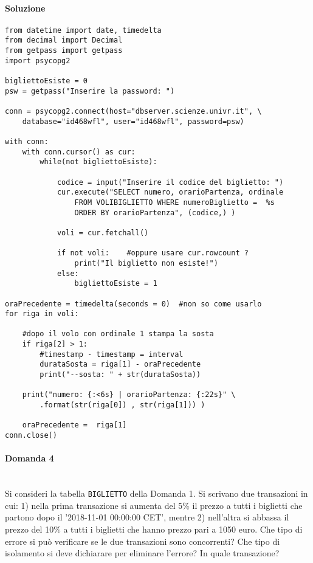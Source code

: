 \documentclass[a4paper, 10pt, titlepage]{article}
\begin{document}
\paragraph{Soluzione}\dotfill
\lstset{language=Python}
\begin{lstlisting}
from datetime import date, timedelta
from decimal import Decimal
from getpass import getpass
import psycopg2

bigliettoEsiste = 0
psw = getpass("Inserire la password: ")
    
conn = psycopg2.connect(host="dbserver.scienze.univr.it", \
	database="id468wfl", user="id468wfl", password=psw)
	
with conn:
	with conn.cursor() as cur:
		while(not bigliettoEsiste):
	
			codice = input("Inserire il codice del biglietto: ")	
			cur.execute("SELECT numero, orarioPartenza, ordinale
				FROM VOLIBIGLIETTO WHERE numeroBiglietto =  %s
				ORDER BY orarioPartenza", (codice,) )
				
			voli = cur.fetchall()
			
			if not voli:	#oppure usare cur.rowcount ?
				print("Il biglietto non esiste!")
			else:
				bigliettoEsiste = 1

oraPrecedente = timedelta(seconds = 0)	#non so come usarlo
for riga in voli:

	#dopo il volo con ordinale 1 stampa la sosta
	if riga[2] > 1:
		#timestamp - timestamp = interval
    	durataSosta = riga[1] - oraPrecedente	
        print("--sosta: " + str(durataSosta))
        
	print("numero: {:<6s} | orarioPartenza: {:22s}" \
        .format(str(riga[0]) , str(riga[1])) )
        
    oraPrecedente =  riga[1]
conn.close()

\end{lstlisting}
\newpage 
\paragraph{Domanda 4}\dotfill
\\Si consideri la tabella \lstinline|BIGLIETTO| della Domanda 1. Si scrivano due transazioni in cui: 1) nella prima transazione si aumenta del 5\% il prezzo a tutti i biglietti che partono dopo il '2018-11-01 00:00:00 CET', mentre 2) nell'altra si abbassa il prezzo del 10\% a tutti i biglietti che hanno prezzo pari a 1050 euro. Che tipo di errore si può verificare se le due transazioni sono concorrenti? Che tipo di isolamento si deve dichiarare per eliminare l'errore? In quale transazione?
\end{document}
